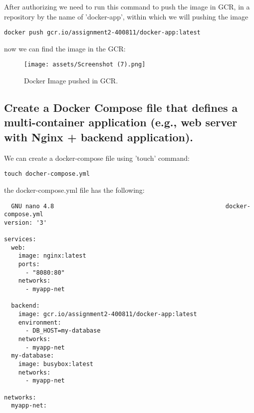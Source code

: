 \documentclass[12pt]{article}
\begin{document}
After authorizing we need to run this command to push the image in GCR, in a repository by the name of 'docker-app', within which we will pushing the image

\begin{listing}[htbp]
\begin{verbatim}
docker push gcr.io/assignment2-400811/docker-app:latest
\end{verbatim}
\end{listing}

\clearpage

now we can find the image in the GCR:

\begin{figure}[htbp]
    \centering
    \texttt{[image: assets/Screenshot (7).png]}
    \caption{Docker Image pushed in GCR.}
    \label{fig:logo}
\end{figure}

\subsection{Create a Docker Compose file that defines a multi-container application (e.g., web server with
Nginx + backend application).
}

We can create a docker-compose file using 'touch' command:

\begin{listing}[htbp]
\begin{verbatim}
touch docher-compose.yml
\end{verbatim}
\end{listing}

the docker-compose.yml file has the following:

\begin{listing}[htbp]
\begin{verbatim}
  GNU nano 4.8                                                docker-compose.yml                                                           
version: '3'

services:
  web:
    image: nginx:latest
    ports:
      - "8080:80"
    networks:
      - myapp-net

  backend:
    image: gcr.io/assignment2-400811/docker-app:latest
    environment:
      - DB_HOST=my-database
    networks:
      - myapp-net
  my-database:
    image: busybox:latest
    networks:
      - myapp-net

networks:
  myapp-net:

\end{verbatim}
\end{listing}
\end{document}
